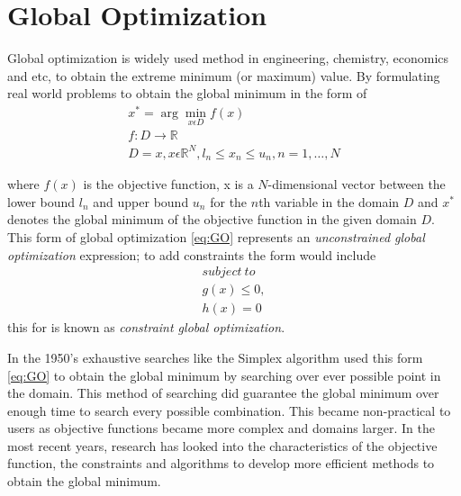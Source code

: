 \chapter{Global Optimization}
\label{background}
Global optimization is widely used method in engineering, chemistry, economics and etc, to obtain the extreme minimum (or maximum) value. By formulating real world problems to obtain the global minimum in the form of
\begin{align}
  \label{eq:GO}
  x^* = \arg \min_{x \epsilon D} f(x) \nonumber \\
  f:D\rightarrow \mathbb{R} \\ 
  D = {x,x\epsilon \mathbb{R}^{N},l_n\leq x_n \leq u_n, n = 1,\ldots,N} \nonumber
\end{align}

where $f(x)$ is the objective function, x is a $N$-dimensional vector between the lower bound $l_n$ and upper bound $u_n$ for the $n$th variable in the domain $D$ and $x^*$ denotes the global minimum of the objective function in the given domain $D$. This form of global optimization \ref{eq:GO} represents an \textit{unconstrained global optimization} expression; to add constraints the form would include 
\begin{align}
  \label{eq:constrainedGO}
  subject\ to \nonumber \\
    g(x) \leq 0, \\ 
    h(x) = 0 \nonumber
\end{align}
this for is known as \textit{constraint global optimization}.

In the 1950's exhaustive searches like the Simplex algorithm \cite{Liberti2000} used this form \ref{eq:GO} to obtain the global minimum by searching over ever possible point in the domain. This method of searching did guarantee the global minimum over enough time to search every possible combination. This became non-practical to users as objective functions became more complex and domains larger. In the most recent years, research has looked into the characteristics of the
objective function, the constraints and algorithms to develop more efficient methods to obtain the global minimum. 

